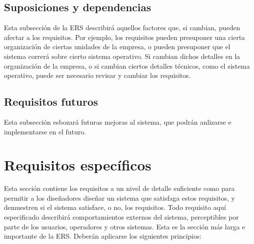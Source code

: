 \documentclass[12pt,a4paper, twosite]{article}
\begin{document}
\subsection{Suposiciones y dependencias}
\label{sec:org0ae23fe}

Esta subsección de la ERS describirá aquellos factores que, si
cambian, pueden afectar a los requisitos. Por ejemplo, los
requisitos pueden presuponer una cierta organización de ciertas
unidades de la empresa, o pueden presuponer que  el sistema correrá
sobre cierto sistema operativo. Si cambian dichos detalles en la
organización de la empresa, o si cambian ciertos detalles técnicos,
como el sistema operativo, puede ser necesario revisar y cambiar los
requisitos. 


\subsection{Requisitos futuros}
\label{sec:org33cfcdb}

Esta subsección esbozará futuras mejoras al sistema, que podrán
anlizarse e implementarse en el futuro.   


\section{Requisitos específicos}
\label{sec:org40573d1}

Esta sección contiene los requisitos a un nivel de detalle suficiente
como para permitir a los diseñadores diseñar un sistema que
satisfaga estos requisitos, y demuestren si el sistema satisface, o
no, los requisitos. Todo requisito aquí especificado describirá
comportamientos externos del sistema, perceptibles por parte de los
usuarios, operadores y otros sistemas. Esta es la sección más larga
e importante de la ERS. Deberán aplicarse los siguientes principios:
\end{document}
